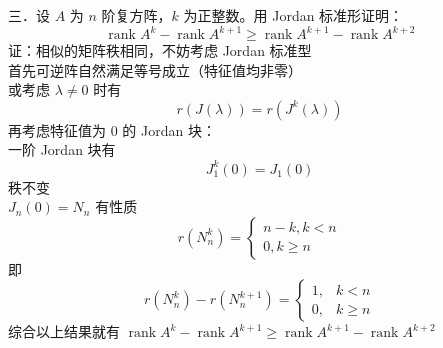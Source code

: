 \documentclass[UTF8]{ctexart}
\begin{document}
\noindent 三．设 $A$ 为 $n$ 阶复方阵，$k$ 为正整数。用 Jordan 标准形证明：
$$
\operatorname{rank} A^{k}-\operatorname{rank} A^{k+1} \geq \operatorname{rank} A^{k+1}-\operatorname{rank} A^{k+2}
$$
证：相似的矩阵秩相同，不妨考虑 Jordan 标准型\\
首先可逆阵自然满足等号成立（特征值均非零）\\
或考虑 $\lambda \neq 0$ 时有 $$r(J(\lambda))=r\left(J^{k}(\lambda)\right)$$
再考虑特征值为 0 的 Jordan 块：\\
一阶 Jordan 块有 
$$J_{1}^{k}(0)=J_{1}(0)$$
秩不变\\
$J_{n}(0)=N_{n}$ 有性质
$$r\left(N_{n}^{k}\right)=\left\{\begin{array}{l}n-k, k<n \\ 0, k \geq n\end{array}\right.$$
即 $$r\left(N_{n}^{k}\right)-r\left(N_{n}^{k+1}\right)= \begin{cases}1, & k<n \\ 0, & k \geq n\end{cases}$$
综合以上结果就有 $\operatorname{rank} A^{k}-\operatorname{rank} A^{k+1} \geq \operatorname{rank} A^{k+1}-\operatorname{rank} A^{k+2}$\\
\end{document}

